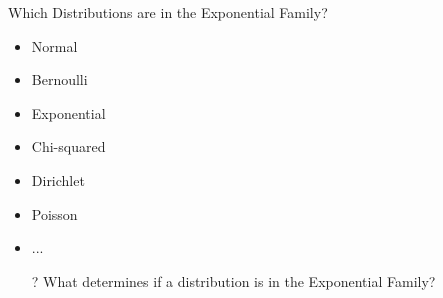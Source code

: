 \documentclass[aspectratio=169]{beamer}
\begin{document}
\begin{frame}{Which Distributions are in the Exponential Family?}

\begin{itemize}
\item Normal
\item Bernoulli
\item Exponential
\item Chi-squared
\item Dirichlet
\item Poisson
\item ...
\item[?] What determines if a distribution is in the Exponential Family? %
\end{itemize}
\end{frame}
\end{document}

